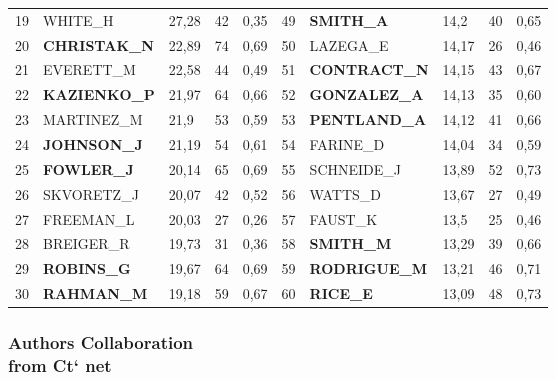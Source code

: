 \documentclass[hyperref={pdfstartview={FitBH -32768},
                         pdfpagemode=FullScreen,
                         plainpages=false,
                         colorlinks=true}
              ]{beamer}
\begin{document}
\begin{frame}[fragile]
\begin{tabular}{c|l|p{0.4cm}|p{0.6cm}|p{0.4cm}||c|l|p{0.4cm}|p{0.6cm}|p{0.4cm}|}
19& 	WHITE\_H& 	27,28& 	42& 	0,35& 	49& 	\textbf{SMITH\_A}& 	14,2& 	40& 	0,65\\
20& 	\textbf{CHRISTAK\_N}& 	22,89& 	74& 	0,69& 	50& 	LAZEGA\_E& 	14,17& 	26& 	0,46\\
21& 	EVERETT\_M& 	22,58& 	44& 	0,49& 	51& 	\textbf{CONTRACT\_N}& 	14,15& 	43& 	0,67\\
22& 	\textbf{KAZIENKO\_P}& 	21,97& 	64& 	0,66& 	52& 	\textbf{GONZALEZ\_A}& 	14,13& 	35& 	0,60\\
23& 	MARTINEZ\_M& 	21,9& 	53& 	0,59& 	53& 	\textbf{PENTLAND\_A}& 	14,12& 	41& 	0,66\\
24& 	\textbf{JOHNSON\_J}& 	21,19& 	54& 	0,61& 	54& 	FARINE\_D& 	14,04& 	34& 	0,59\\
25& 	\textbf{FOWLER\_J}& 	20,14& 	65& 	0,69& 	55& 	SCHNEIDE\_J& 	13,89& 	52& 	0,73\\
26& 	SKVORETZ\_J& 	20,07& 	42& 	0,52& 	56& 	WATTS\_D& 	13,67& 	27& 	0,49\\
27& 	FREEMAN\_L& 	20,03& 	27& 	0,26& 	57& 	FAUST\_K& 	13,5& 	25& 	0,46\\
28& 	BREIGER\_R& 	19,73& 	31& 	0,36& 	58& 	\textbf{SMITH\_M}& 	13,29& 	39& 	0,66\\
29& 	\textbf{ROBINS\_G}& 	19,67& 	64& 	0,69& 	59& 	\textbf{RODRIGUE\_M}& 	13,21& 	46& 	0,71\\
30& 	\textbf{RAHMAN\_M}& 	19,18& 	59& 	0,67& 	60& 	\textbf{RICE\_E}& 	13,09& 	48& 	0,73\\
\end{tabular}

\end{frame}

\begin{frame}[fragile]
\frametitle{Authors Collaboration \\ \normalsize from Ct` net}

\end{frame}
\end{document}
